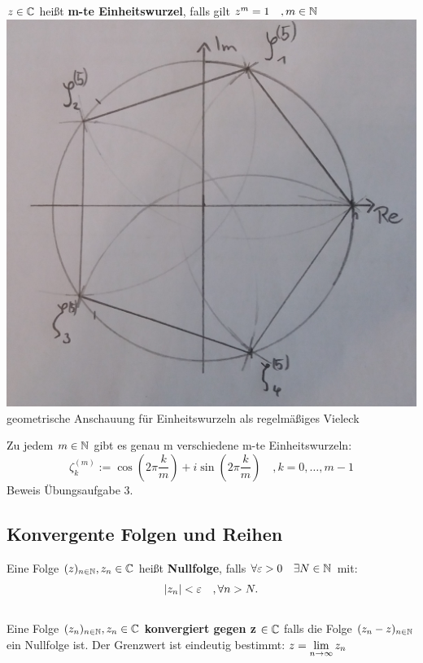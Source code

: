 \begin{definition}
$z \in \mathbb{C} $ heißt \textbf{m-te Einheitswurzel}, falls gilt $z^m = 1 \quad, m \in \mathbb{N}$ \\
\includegraphics[scale=0.125]{pics/Wurzeln.jpg} \\
geometrische Anschauung für Einheitswurzeln als regelmäßiges Vieleck 
\end{definition}
\begin{satz}
Zu jedem $m \in \mathbb{N}$ gibt es genau m verschiedene m-te Einheitswurzeln:
\[
\zeta^{(m)}_k := \cos(2\pi\frac{k}{m})+i\sin(2\pi\frac{k}{m})\quad, k=0,\dots,m-1
\]
Beweis Übungsaufgabe 3.
\end{satz}

\subsection{Konvergente Folgen und Reihen}
\begin{definition}
Eine Folge $(z)_{n \in \mathbb{N}}, z_n \in \mathbb{C}$ heißt \textbf{Nullfolge}, falls $\forall \varepsilon > 0 \quad \exists N \in \mathbb{N}$ mit: 
\[|z_n| < \varepsilon \quad ,\forall n>N.\] \\
Eine Folge $(z_n)_{n\in \mathbb{N}}, z_n \in \mathbb{C}$ \textbf{konvergiert gegen z} $\in \mathbb{C}$
falls die Folge $(z_n-z)_{n\in \mathbb{N}}$ ein Nullfolge ist. Der Grenzwert ist eindeutig bestimmt: 
$\begin{displaystyle}
	z = \lim_{n \to \infty}z_n
\end{displaystyle}$
\end{definition}

